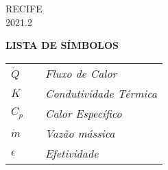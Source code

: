 \documentclass[a4paper,12pt,oneside]{article}
\begin{document}
\begin{center}
\large{
\vspace{2.9cm}
RECIFE\\
\vspace{0.2cm}
2021.2	
}
\end{center}
\thispagestyle{empty}




\pagebreak
\clearpage
\newpage	


\begin{center}
	\renewcommand{\listfigurename}{\large LISTA DE ILUSTRAÇÕES}
	\listoffigures
	\thispagestyle{empty}
\end{center}



\pagebreak
\clearpage
\newpage	

\begin{center}
	\renewcommand{\listtablename}{\large LISTA DE TABELAS}
	\listoftables
	\thispagestyle{empty}
\end{center}

\pagebreak
\clearpage
\newpage


\large \centering \textbf {LISTA DE SÍMBOLOS }\\
\vspace{0.5cm}
\begin{flushleft}
	\begin{tabularx}{12cm}{X X l}
	
		$\dot{Q}$ &  &  \itshape Fluxo de Calor\\
		$K$ &  &  \itshape Condutividade Térmica\\
		$C_{p}$ &  &  \itshape Calor Específico\\
		$\dot{m}$ &  &  \itshape Vazão mássica\\
		$\epsilon$ &  &  \itshape Efetividade
\end{tabularx}
\end{flushleft}
\thispagestyle{empty}


\pagebreak
\clearpage
\newpage


\begin{center}
	
	\renewcommand{\contentsname}{\large SUMÁRIO}
	
	 \tableofcontents
\end{center}
\thispagestyle{empty}


\pagebreak
\clearpage
\newpage
		
\end{document}
